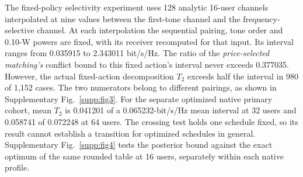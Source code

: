 The fixed-policy selectivity experiment uses 128 analytic 16-user channels
interpolated at nine values between the first-tone channel and the
frequency-selective channel. At each interpolation the sequential pairing,
tone order and 0.10-W powers are fixed, with its receiver recomputed for
that input. Its interval ranges from 0.035915 to 2.343011 bit/s/Hz.
The ratio of the \emph{price-selected matching's} conflict bound to this
fixed action's interval never exceeds 0.377035.
However, the actual fixed-action decomposition \(T_2\) exceeds half the interval
in 980 of 1,152 cases. The two numerators belong to different pairings,
as shown in Supplementary Fig.~\ref{supp:fig3}.
For the separate optimized native primary cohort, mean \(T_2\) is
0.041201 of a 0.065232-bit/s/Hz mean interval at 32 users and
0.058741 of 0.072248 at 64 users. The crossing test holds one schedule fixed, so its result cannot establish a transition for optimized schedules in general. Supplementary Fig.~\ref{supp:fig4} tests the posterior bound against
the exact optimum of the same rounded table at 16 users, separately
within each native profile.



